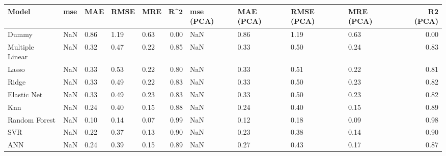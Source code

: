 \begin{table}
\centering
\label{table:iri_reg_pred}
\begin{tabular}{lllllrllllr}
\toprule
 \textbf{Model} & \textbf{mse} & \textbf{MAE} & \textbf{RMSE} & \textbf{MRE} & $\textbf{R^2}$ & \textbf{mse (PCA)} & \textbf{MAE (PCA)} & \textbf{RMSE (PCA)} & \textbf{MRE (PCA)} & \textbf{R2 (PCA)} \\
\midrule
          Dummy &          NaN &         0.86 &          1.19 &         0.63 &           0.00 &                NaN &               0.86 &                1.19 &               0.63 &              0.00 \\
Multiple Linear &          NaN &         0.32 &          0.47 &         0.22 &           0.85 &                NaN &               0.33 &                0.50 &               0.24 &              0.83 \\
          Lasso &          NaN &         0.33 &          0.53 &         0.22 &           0.80 &                NaN &               0.33 &                0.51 &               0.22 &              0.81 \\
          Ridge &          NaN &         0.33 &          0.49 &         0.22 &           0.83 &                NaN &               0.33 &                0.50 &               0.23 &              0.82 \\
    Elastic Net &          NaN &         0.33 &          0.49 &         0.23 &           0.83 &                NaN &               0.33 &                0.50 &               0.23 &              0.82 \\
            Knn &          NaN &         0.24 &          0.40 &         0.15 &           0.88 &                NaN &               0.24 &                0.40 &               0.15 &              0.89 \\
  Random Forest &          NaN &         0.10 &          0.14 &         0.07 &           0.99 &                NaN &               0.12 &                0.18 &               0.09 &              0.98 \\
            SVR &          NaN &         0.22 &          0.37 &         0.13 &           0.90 &                NaN &               0.23 &                0.38 &               0.14 &              0.90 \\
            ANN &          NaN &         0.24 &          0.39 &         0.15 &           0.89 &                NaN &               0.27 &                0.43 &               0.17 &              0.87 \\
\bottomrule
\end{tabular}
\end{table}
